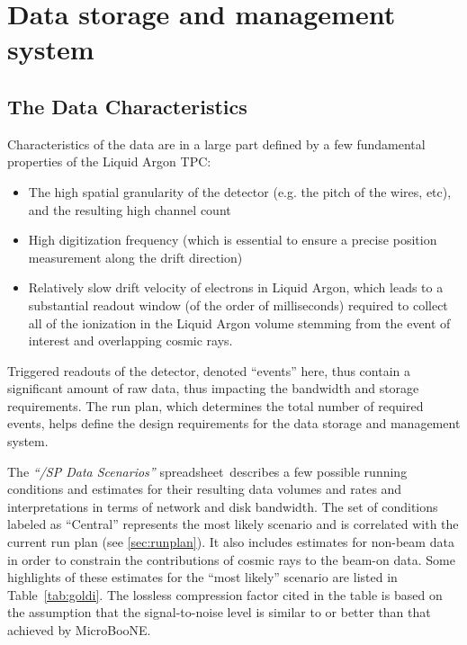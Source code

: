 \section{Data storage and management system}

\subsection{The \pd Data Characteristics}
Characteristics of the \pd data are in a large part defined by a few fundamental
properties of the \pd Liquid Argon TPC:
\begin{itemize}
\item The high spatial granularity of the detector (e.g. the pitch of the wires, etc), and the resulting high channel count
\item High digitization frequency (which is essential to ensure a precise position measurement along the drift direction)
\item Relatively slow drift velocity of electrons in Liquid Argon, which  leads to a substantial readout window (of the order of milliseconds) required to collect
all of the ionization in the Liquid Argon volume stemming from the event of interest and overlapping cosmic rays.
\end{itemize}

Triggered readouts of the detector, denoted ``events'' here, 
thus contain a significant amount of raw data, thus impacting the bandwidth and
storage requirements.   The run plan, which determines the total number of required events, 
helps define the design requirements for the data storage and management system.

The \textit{``\pd/SP Data Scenarios''} spreadsheet\,\cite{data_spreadsheet}  %
describes a few possible running conditions and estimates for their
resulting data volumes and rates and interpretations in terms of
network and disk bandwidth. The set of conditions labeled as ``Central'' represents the most likely scenario
and is correlated with the current run plan (see \ref{sec:runplan}).
 It also includes estimates for non-beam
data in order to constrain the contributions of cosmic rays to the beam-on data.  Some highlights
of these estimates for the ``most likely'' scenario
are listed in Table~\ref{tab:goldi}. The lossless compression factor cited
in the table is based on the assumption that the signal-to-noise level 
is similar to or better than that achieved by MicroBooNE.

